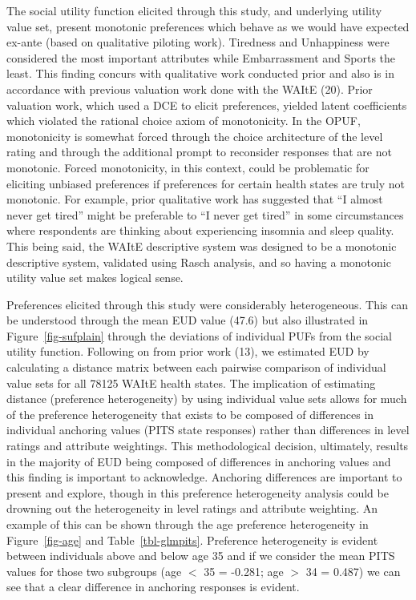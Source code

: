 \documentclass[
  letterpaper,
  DIV=11,
  numbers=noendperiod]{scrartcl}
\begin{document}
The social utility function elicited through this study, and underlying
utility value set, present monotonic preferences which behave as we
would have expected ex-ante (based on qualitative piloting work).
Tiredness and Unhappiness were considered the most important attributes
while Embarrassment and Sports the least. This finding concurs with
qualitative work conducted prior and also is in accordance with previous
valuation work done with the WAItE (20). Prior valuation work, which
used a DCE to elicit preferences, yielded latent coefficients which
violated the rational choice axiom of monotonicity. In the OPUF,
monotonicity is somewhat forced through the choice architecture of the
level rating and through the additional prompt to reconsider responses
that are not monotonic. Forced monotonicity, in this context, could be
problematic for eliciting unbiased preferences if preferences for
certain health states are truly not monotonic. For example, prior
qualitative work has suggested that ``I almost never get tired'' might
be preferable to ``I never get tired'' in some circumstances where
respondents are thinking about experiencing insomnia and sleep quality.
This being said, the WAItE descriptive system was designed to be a
monotonic descriptive system, validated using Rasch analysis, and so
having a monotonic utility value set makes logical sense.

Preferences elicited through this study were considerably heterogeneous.
This can be understood through the mean EUD value (47.6) but also
illustrated in Figure~\ref{fig-sufplain} through the deviations of
individual PUFs from the social utility function. Following on from
prior work (13), we estimated EUD by calculating a distance matrix
between each pairwise comparison of individual value sets for all 78125
WAItE health states. The implication of estimating distance (preference
heterogeneity) by using individual value sets allows for much of the
preference heterogeneity that exists to be composed of differences in
individual anchoring values (PITS state responses) rather than
differences in level ratings and attribute weightings. This
methodological decision, ultimately, results in the majority of EUD
being composed of differences in anchoring values and this finding is
important to acknowledge. Anchoring differences are important to present
and explore, though in this preference heterogeneity analysis could be
drowning out the heterogeneity in level ratings and attribute weighting.
An example of this can be shown through the age preference heterogeneity
in Figure~\ref{fig-age} and Table~\ref{tbl-glmpits}. Preference
heterogeneity is evident between individuals above and below age 35 and
if we consider the mean PITS values for those two subgroups (age \(<\)
35 = -0.281; age \(>\) 34 = 0.487) we can see that a clear difference in
anchoring responses is evident.
\end{document}
